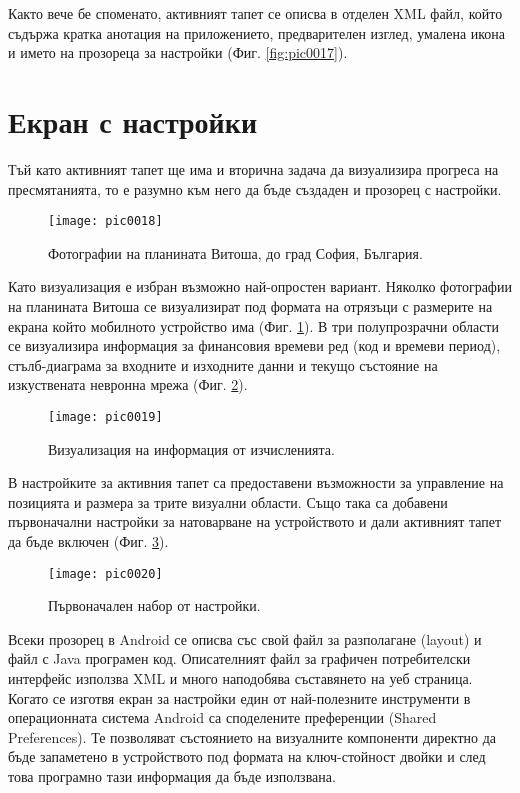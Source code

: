 Както вече бе споменато, активният тапет се описва в отделен XML файл, който съдържа кратка анотация на приложението, предварителен изглед, умалена икона и името на прозореца за настройки (Фиг. \ref{fig:pic0017}). 

\section{Екран с настройки}

Тъй като активният тапет ще има и вторична задача да визуализира прогреса на пресмятанията, то е разумно към него да бъде създаден и прозорец с настройки. 

\begin{figure}[h]
  \centering
  \texttt{[image: pic0018]}
  \caption{Фотографии на планината Витоша, до град София, България.}
\label{fig:pic0018}
\end{figure}
\FloatBarrier

Като визуализация е избран възможно най-опростен вариант. Няколко фотографии на планината Витоша се визуализират под формата на отрязъци с размерите на екрана който мобилното устройство има (Фиг. \ref{fig:pic0018}). В три полупрозрачни области се визуализира информация за финансовия времеви ред (код и времеви период), стълб-диаграма за входните и изходните данни и текущо състояние на изкуствената невронна мрежа (Фиг. \ref{fig:pic0019}). 

\begin{figure}[h]
  \centering
  \texttt{[image: pic0019]}
  \caption{Визуализация на информация от изчисленията.}
\label{fig:pic0019}
\end{figure}
\FloatBarrier

В настройките за активния тапет са предоставени възможности за управление на позицията и размера за трите визуални области. Също така са добавени първоначални настройки за натоварване на устройството и дали активният тапет да бъде включен (Фиг. \ref{fig:pic0020}). 

\begin{figure}[h]
  \centering
  \texttt{[image: pic0020]}
  \caption{Първоначален набор от настройки.}
\label{fig:pic0020}
\end{figure}
\FloatBarrier

Всеки прозорец в Android се описва със свой файл за разполагане (layout) и файл с Java програмен код. Описателният файл за графичен потребителски интерфейс използва XML и много наподобява съставянето на уеб страница. Когато се изготвя екран за настройки един от най-полезните инструменти в операционната система Android са споделените преференции (Shared Preferences). Те позволяват състоянието на визуалните компоненти директно да бъде запаметено в устройството под формата на ключ-стойност двойки и след това програмно тази информация да бъде използвана. 

